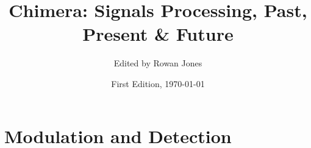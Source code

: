 \documentclass[11pt,oneside]{book}
\title{Chimera: Signals Processing, Past, Present \& Future}
\author{Edited by Rowan Jones}
\date{First Edition, \today}
\begin{document}
\frontmatter

\begin{titlepage}
\thispagestyle{empty}

\end{titlepage}









\tableofcontents
\clearpage



\mainmatter



\part{Modulation and Detection}
\label{part:modulation}










% 

% 
\end{document}
